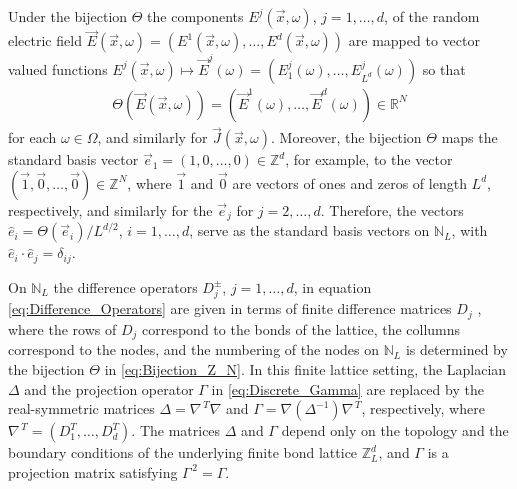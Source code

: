 \documentclass{cmslatex}
\begin{document}
Under the bijection $\Theta$ the components
$E^j(\vec{x},\omega)$, $j=1,\ldots,d$, of the random electric field
$\vec{E}(\vec{x},\omega)=(E^1(\vec{x},\omega),\ldots ,E^d(\vec{x},\omega))$ are mapped to
vector valued functions $E^j(\vec{x},\omega)\mapsto\vec{E}^j(\omega)=(E^j_1(\omega),\ldots,
E^j_{L^d}(\omega))$ so that
% 
\begin{align}\label{eq:bijection_vector_mapping}
  \Theta(\vec{E}(\vec{x},\omega))=(\vec{E}^1(\omega),\ldots ,\vec{E}^d(\omega))\in\mathbb{R}^N
\end{align}
%
for each $\omega\in\Omega$, and similarly for $\vec{J}(\vec{x},\omega)$. Moreover, the
bijection $\Theta$ maps the standard basis vector
$\vec{e}_1=(1,0,\ldots,0)\in\mathbb{Z}^d$, for example, to the
vector $(\vec{1},\vec{0},\ldots,\vec{0})\in\mathbb{Z}^N$, where
$\vec{1}$ and $\vec{0}$ are vectors of ones and zeros of length
$L^d$, respectively, and similarly for the $\vec{e}_j$ for
$j=2,\ldots,d$. Therefore, the vectors $\hat{e}_i=\Theta(\vec{e}_i)/L^{d/2}$,
$i=1,\ldots,d$, serve as the standard basis vectors on $\mathbb{N}_L$, with
$\hat{e}_i\cdot\hat{e}_j=\delta_{ij}$.


On $\mathbb{N}_L$ the difference operators $D_j^\pm$, $j=1,\ldots,d$, in
equation \eqref{eq:Difference_Operators} are given in terms of finite 
difference matrices $D_j$ \cite{Demmel:1997}, where the rows of $D_j$
correspond to the bonds of the lattice, the collumns
correspond to the nodes, and the numbering of the nodes on
$\mathbb{N}_L$ is determined by the bijection $\Theta$ in
\eqref{eq:Bijection_Z_N}. In this finite lattice 
setting, the Laplacian $\Delta$ and the projection operator $\Gamma$ in
\eqref{eq:Discrete_Gamma} are replaced by the real-symmetric matrices
$\Delta=\nabla^{\,T}\nabla$ and $\Gamma=\nabla(\Delta^{-1})\nabla^{\,T}$, respectively, where
$\nabla^{\,T}=(D_1^T,\ldots,D_d^T)$. The matrices $\Delta$ and $\Gamma$ depend only on the
topology and the boundary conditions of the underlying finite bond
lattice $\mathbb{Z}_L^d$, and $\Gamma$ is a projection matrix satisfying
$\Gamma^{\,2}=\Gamma$. 
\end{document}
